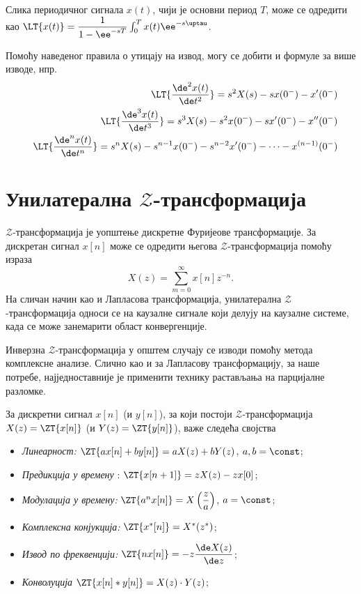 Слика периодичног сигнала $x(t)$, чији је основни период $T$, може се одредити као 
$\LT{x(t)} = \dfrac{1}{1 - \ee^{-sT}} \int_0^T x(t) \ee^{-s\uptau}$.

Помоћу наведеног правила о утицају на извод, могу се добити и формуле за више изводе, нпр.
\begin{eqnarray}
    && \LT{ \dfrac{\de^2 x(t)}{\de t^2} } = s^2 X(s) - s x(0^-) - x'(0^-) \\
    && \LT{ \dfrac{\de^3 x(t)}{\de t^3} } = s^3 X(s) - s^2 x(0^-) - s x'(0^-) - x''(0^-) \\
    && \LT{ \dfrac{\de^n x(t)}{\de t^n} } = s^n X(s) - s^{n-1} x(0^-) - s^{n-2} x'(0^-) - \cdots - x^{(n-1)} (0^-) 
\end{eqnarray}


\section*{Унилатерална $\mathcal{Z}$-трансформација}

$\mathcal{Z}$-трансформација је уопштење дискретне Фуријеове трансформације. За дискретан сигнал $x[n]$ може се одредити
његова $\mathcal{Z}$-трансформација помоћу израза 
\begin{equation}
        X(z) = \sum_{m = 0}^{\infty} x[n] z^{-n}.
\end{equation}
На сличан начин као и Лапласова трансформација, унилатерална $\mathcal{Z}$-трансформација односи се на каузалне сигнале 
који делују на каузалне системе, када се може занемарити област конвергенције.

Инверзна $\mathcal{Z}$-трансформација у општем случају се изводи помоћу метода комплексне анализе. 
Слично као и за Лапласову трансформацију, за наше потребе, најједноставније је 
применити технику растављања на парцијалне разломке.

За дискретни сигнал $x[n]$ (и $y[n]$), за који постоји $\mathcal{Z}$-трансформација
$X(z) = \ZT{x[n]}$ (и $Y(z) = \ZT{y[n]}$), важе следећа својства
\begin{itemize}
    \item \emph{Линеарност:} $\ZT{ax[n] + by[n]} = a X(z) + b Y(z)$, \qquad $a,b = \const$; \hfill \Svojstvo
    \item \emph{Предикција у времену} : $\ZT{x[n+1]} = z X(z) - z x[0]$; \hfill \Svojstvo
    \item \emph{Модулација у времену:} $\ZT{ a^n x[n] } = X \left(\dfrac{z}{a}\right)$, \qquad $a = \const$; \hfill \Svojstvo
    \item \emph{Комплексна конјукција:} $\ZT{ x^{\ast}[n] } = X^{\ast}(z^{\ast})$; \hfill \Svojstvo
    \item \emph{Извод по фреквенцији:} $\ZT{n x[n]} = -z \dfrac{\de X(z) }{\de z}$; \hfill \Svojstvo
    \item \emph{Конволуција} $\ZT{x[n]  \ast y[n]} = X(z) \cdot Y(z)$;  \hfill \Svojstvo
\end{itemize} 